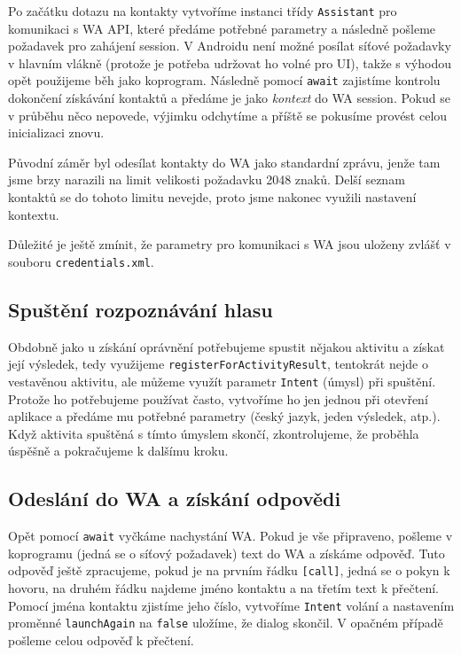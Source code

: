 Po začátku dotazu na kontakty vytvoříme instanci třídy \texttt{Assistant}
pro komunikaci s WA API, které předáme potřebné parametry a následně pošleme
požadavek pro zahájení session. V Androidu není možné posílat síťové požadavky
v hlavním vlákně (protože je potřeba udržovat ho volné pro UI), takže s výhodou
opět použijeme běh jako koprogram. Následně pomocí \texttt{await} zajistíme
kontrolu dokončení získávání kontaktů a předáme je jako \textit{kontext} do
WA session. Pokud se v průběhu něco nepovede, výjimku odchytíme a příště
se pokusíme provést celou inicializaci znovu.

Původní záměr byl odesílat kontakty do WA jako standardní zprávu, jenže
tam jsme brzy narazili na limit velikosti požadavku 2048 znaků. Delší
seznam kontaktů se do tohoto limitu nevejde, proto jsme nakonec využili
nastavení kontextu.

Důležité je ještě zmínit, že parametry pro komunikaci s WA jsou uloženy
zvlášť v souboru \texttt{credentials.xml}.

\subsection{Spuštění rozpoznávání hlasu}

Obdobně jako u získání
oprávnění potřebujeme spustit nějakou aktivitu a získat její výsledek, tedy
využijeme \texttt{registerForActivityResult}, tentokrát nejde o vestavěnou
aktivitu, ale můžeme využít parametr \texttt{Intent} (úmysl) při spuštění.
Protože ho potřebujeme používat často, vytvoříme ho jen jednou při otevření
aplikace a předáme mu potřebné parametry (český jazyk, jeden výsledek, atp.).
Když aktivita spuštěná s tímto úmyslem skončí, zkontrolujeme, že proběhla
úspěšně a pokračujeme k dalšímu kroku.

\subsection{Odeslání do WA a získání odpovědi}
Opět pomocí \texttt{await} vyčkáme nachystání WA. Pokud je vše připraveno,
pošleme v koprogramu (jedná se o síťový požadavek) text do WA a získáme odpověď.
Tuto odpověď ještě zpracujeme, pokud je na prvním řádku \texttt{[call]}, jedná
se o pokyn k hovoru, na druhém řádku najdeme jméno kontaktu a na třetím text k
přečtení. Pomocí jména kontaktu zjistíme jeho číslo, vytvoříme \texttt{Intent}
volání a nastavením proměnné \texttt{launchAgain} na \texttt{false} uložíme,
že dialog skončil. V opačném případě pošleme celou odpověď k přečtení.

